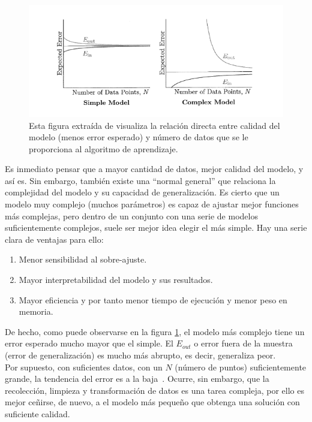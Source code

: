 \begin{figure}[H]
    \begin{center}
        \includegraphics[width=1\textwidth]{imagenes/learning_from_data_vc.png}
    \end{center}
    \caption[Correlación entre error del modelo y N]{Esta figura extraída de \cite{Mostafa2012} visualiza la relación directa entre calidad del modelo (menos error esperado) y número de datos que se le proporciona al algoritmo de aprendizaje.}
    \label{fig:learning_from_data_vc}
\end{figure}

Es inmediato pensar que a mayor cantidad de datos, mejor calidad del modelo, y así es. Sin embargo, también existe una ``normal general'' que relaciona la complejidad del modelo y su capacidad de generalización. Es cierto que un modelo muy complejo (muchos parámetros) es capaz de ajustar mejor funciones más complejas, pero dentro de un conjunto con una serie de modelos suficientemente complejos, suele ser mejor idea elegir el más simple. Hay una serie clara de ventajas para ello:
\begin{enumerate}
    \item Menor  sensibilidad al sobre-ajuste.
    \item Mayor interpretabilidad del modelo y sus resultados.
    \item Mayor eficiencia y por tanto menor tiempo de ejecución y menor peso en memoria.
\end{enumerate}

De hecho, como puede observarse en la figura \ref{fig:learning_from_data_vc}, el modelo más complejo tiene un error esperado mucho mayor que el simple. El $E_{out}$ o error fuera de la muestra (error de generalización) es mucho más abrupto, es decir, generaliza peor.\\[6pt]
Por supuesto, con suficientes datos, con un $N$ (número de puntos) suficientemente grande, la tendencia del error es a la baja~\cite{Mostafa2012, shalev2014understanding}. Ocurre, sin embargo, que la recolección, limpieza y transformación de datos es una tarea compleja, por ello es mejor ceñirse, de nuevo, a el modelo más pequeño que obtenga una solución con suficiente calidad.

